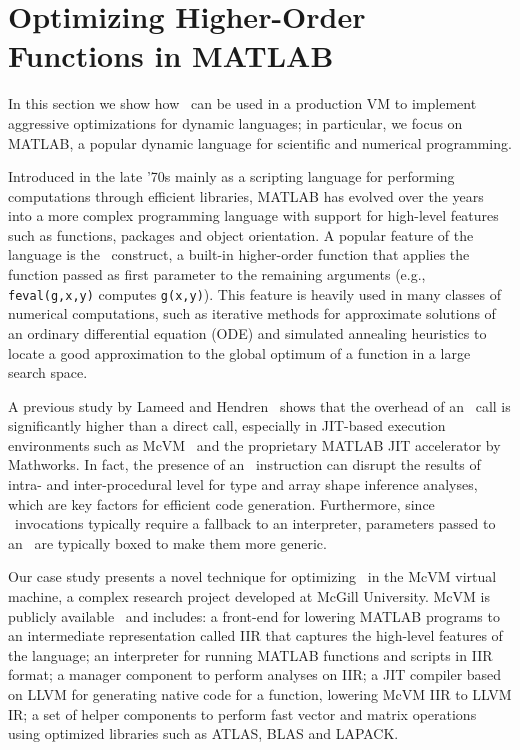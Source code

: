 
\section{Optimizing Higher-Order Functions in MATLAB}
\label{se:CS-matlab}

In this section we show how \osrkit\ can be used in a production VM to implement aggressive optimizations for dynamic languages; in particular, we focus on MATLAB, a popular dynamic language for scientific and numerical programming.

Introduced in the late '70s mainly as a scripting language for performing computations through efficient libraries, MATLAB has evolved over the years into a more complex programming language with support for high-level features such as functions, packages and object orientation. A popular feature of the language is the \feval\ construct, a built-in higher-order function that applies the function passed as first parameter to the remaining arguments (e.g., {\tt feval(g,x,y)} computes {\tt g(x,y)}). This feature is heavily used in many classes of numerical computations, such as iterative methods for approximate solutions of an ordinary differential equation (ODE) and simulated annealing heuristics to locate a good approximation to the global optimum of a function in a large search space.

A previous study by Lameed and Hendren~\cite{Lameed2013b} shows that the overhead of an \feval\ call is significantly higher than a direct call, especially in JIT-based execution environments such as McVM~\cite{Chevalier2010} and the proprietary MATLAB JIT accelerator by Mathworks. In fact, the presence of an \feval\ instruction can disrupt the results of intra- and inter-procedural level for type and array shape inference analyses, which are key factors for efficient code generation. Furthermore, since \feval\ invocations typically require a fallback to an interpreter, parameters passed to an \feval\ are typically boxed to make them more generic.

Our case study presents a novel technique for optimizing \feval\ in the McVM virtual machine, a complex research project developed at McGill University. McVM is publicly available~\cite{mcvm} and includes: a front-end for lowering MATLAB programs to an intermediate representation called IIR that captures the high-level features of the language; an interpreter for running MATLAB functions and scripts in IIR format; a manager component to perform analyses on IIR; a JIT compiler based on LLVM for generating native code for a function, lowering McVM IIR to LLVM IR; a set of helper components to perform fast vector and matrix operations using optimized libraries such as ATLAS, BLAS and LAPACK. %

